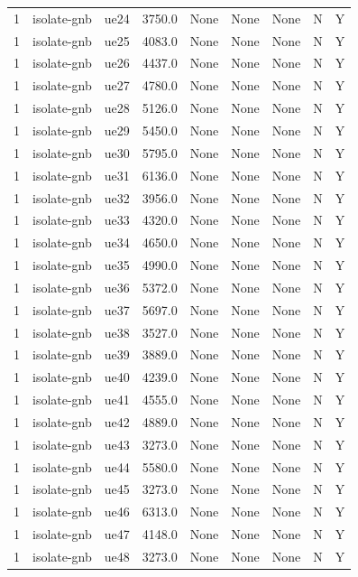 \begin{table}[ht]
\begin{tabular}{|c|c|c|c|c|c|c|c|c|}
1 & isolate-gnb & ue24 & 3750.0 & None & None & None & N & Y \\
1 & isolate-gnb & ue25 & 4083.0 & None & None & None & N & Y \\
1 & isolate-gnb & ue26 & 4437.0 & None & None & None & N & Y \\
1 & isolate-gnb & ue27 & 4780.0 & None & None & None & N & Y \\
1 & isolate-gnb & ue28 & 5126.0 & None & None & None & N & Y \\
1 & isolate-gnb & ue29 & 5450.0 & None & None & None & N & Y \\
1 & isolate-gnb & ue30 & 5795.0 & None & None & None & N & Y \\
1 & isolate-gnb & ue31 & 6136.0 & None & None & None & N & Y \\
1 & isolate-gnb & ue32 & 3956.0 & None & None & None & N & Y \\
1 & isolate-gnb & ue33 & 4320.0 & None & None & None & N & Y \\
1 & isolate-gnb & ue34 & 4650.0 & None & None & None & N & Y \\
1 & isolate-gnb & ue35 & 4990.0 & None & None & None & N & Y \\
1 & isolate-gnb & ue36 & 5372.0 & None & None & None & N & Y \\
1 & isolate-gnb & ue37 & 5697.0 & None & None & None & N & Y \\
1 & isolate-gnb & ue38 & 3527.0 & None & None & None & N & Y \\
1 & isolate-gnb & ue39 & 3889.0 & None & None & None & N & Y \\
1 & isolate-gnb & ue40 & 4239.0 & None & None & None & N & Y \\
1 & isolate-gnb & ue41 & 4555.0 & None & None & None & N & Y \\
1 & isolate-gnb & ue42 & 4889.0 & None & None & None & N & Y \\
1 & isolate-gnb & ue43 & 3273.0 & None & None & None & N & Y \\
1 & isolate-gnb & ue44 & 5580.0 & None & None & None & N & Y \\
1 & isolate-gnb & ue45 & 3273.0 & None & None & None & N & Y \\
1 & isolate-gnb & ue46 & 6313.0 & None & None & None & N & Y \\
1 & isolate-gnb & ue47 & 4148.0 & None & None & None & N & Y \\
1 & isolate-gnb & ue48 & 3273.0 & None & None & None & N & Y \\

\end{tabular}
\end{table}
